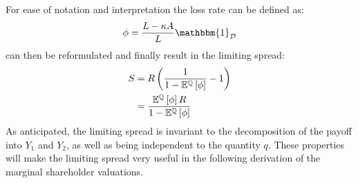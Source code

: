 \documentclass[../main.tex]{subfiles}
\begin{document}
        For ease of notation and interpretation the loss rate can be defined as:
            \begin{equation}
                \phi = \frac{
                        L - \kappa A
                    }{
                        L
                    } 
                \mathbbm{1}_{\mathcal{D}}
                \label{eqn:creditor-loss-rate}
            \end{equation}
         can then be reformulated and finally result in the limiting spread:
            \begin{align}
                    S
                &=
                    R
                    \left(
                        \frac{
                            1   
                        }{
                            1
                            -
                            \mathbb{E}^{\mathbb{Q}}\left[
                                \phi
                            \right]
                        }
                        - 
                        1
                    \right)
                \nonumber \\
                &=
                    \frac{
                        \mathbb{E}^{\mathbb{Q}}\left[\phi\right]
                        R
                    }{
                        1
                        -
                        \mathbb{E}^{\mathbb{Q}}\left[\phi\right]
                    }
                \label{eqn:limiting-spread}
            \end{align}
        As anticipated, the limiting spread is invariant to the decomposition of the payoff into $Y_{1}$ and $Y_{2}$,
        as well as being independent to the quantity $q$. 
        These properties will make the limiting spread very useful in the following derivation
        of the marginal shareholder valuations.
        
\end{document}
